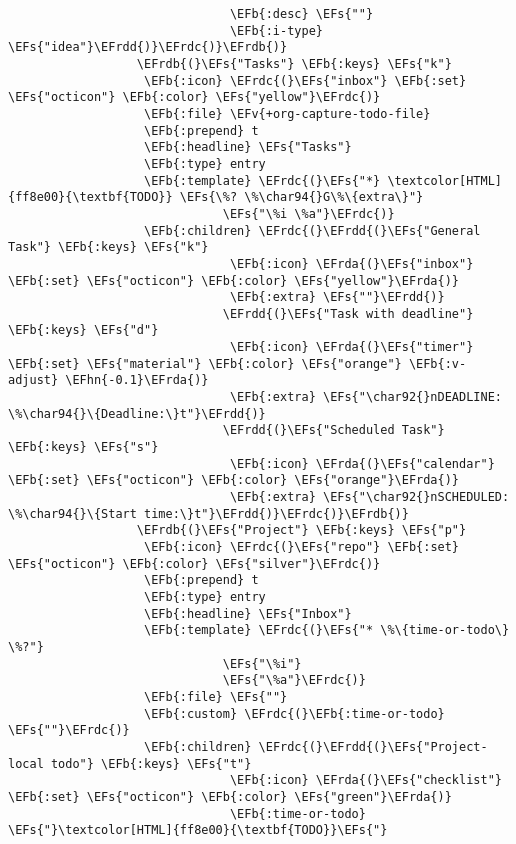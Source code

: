 \documentclass[c]{article}
\theoremstyle{plain}%
\theoremstyle{definition}
\theoremstyle{remark}
\newcommand{\EFs}[1]{\textcolor{EFs}{#1}} %
\newcommand{\EFb}[1]{\textcolor{EFb}{#1}} %
\newcommand{\EFv}[1]{\textcolor{EFv}{#1}} %
\newcommand{\EFhn}[1]{\textcolor{EFhn}{\textbf{#1}}} %
\newcommand{\EFrda}[1]{\textcolor{EFrda}{#1}} %
\newcommand{\EFrdb}[1]{\textcolor{EFrdb}{#1}} %
\newcommand{\EFrdc}[1]{\textcolor{EFrdc}{#1}} %
\newcommand{\EFrdd}[1]{\textcolor{EFrdd}{#1}} %
\begin{document}
\begin{Code}
\begin{Verbatim}
                               \EFb{:desc} \EFs{""}
                               \EFb{:i-type} \EFs{"idea"}\EFrdd{)}\EFrdc{)}\EFrdb{)}
                  \EFrdb{(}\EFs{"Tasks"} \EFb{:keys} \EFs{"k"}
                   \EFb{:icon} \EFrdc{(}\EFs{"inbox"} \EFb{:set} \EFs{"octicon"} \EFb{:color} \EFs{"yellow"}\EFrdc{)}
                   \EFb{:file} \EFv{+org-capture-todo-file}
                   \EFb{:prepend} t
                   \EFb{:headline} \EFs{"Tasks"}
                   \EFb{:type} entry
                   \EFb{:template} \EFrdc{(}\EFs{"*} \textcolor[HTML]{ff8e00}{\textbf{TODO}} \EFs{\%? \%\char94{}G\%\{extra\}"}
                              \EFs{"\%i \%a"}\EFrdc{)}
                   \EFb{:children} \EFrdc{(}\EFrdd{(}\EFs{"General Task"} \EFb{:keys} \EFs{"k"}
                               \EFb{:icon} \EFrda{(}\EFs{"inbox"} \EFb{:set} \EFs{"octicon"} \EFb{:color} \EFs{"yellow"}\EFrda{)}
                               \EFb{:extra} \EFs{""}\EFrdd{)}
                              \EFrdd{(}\EFs{"Task with deadline"} \EFb{:keys} \EFs{"d"}
                               \EFb{:icon} \EFrda{(}\EFs{"timer"} \EFb{:set} \EFs{"material"} \EFb{:color} \EFs{"orange"} \EFb{:v-adjust} \EFhn{-0.1}\EFrda{)}
                               \EFb{:extra} \EFs{"\char92{}nDEADLINE: \%\char94{}\{Deadline:\}t"}\EFrdd{)}
                              \EFrdd{(}\EFs{"Scheduled Task"} \EFb{:keys} \EFs{"s"}
                               \EFb{:icon} \EFrda{(}\EFs{"calendar"} \EFb{:set} \EFs{"octicon"} \EFb{:color} \EFs{"orange"}\EFrda{)}
                               \EFb{:extra} \EFs{"\char92{}nSCHEDULED: \%\char94{}\{Start time:\}t"}\EFrdd{)}\EFrdc{)}\EFrdb{)}
                  \EFrdb{(}\EFs{"Project"} \EFb{:keys} \EFs{"p"}
                   \EFb{:icon} \EFrdc{(}\EFs{"repo"} \EFb{:set} \EFs{"octicon"} \EFb{:color} \EFs{"silver"}\EFrdc{)}
                   \EFb{:prepend} t
                   \EFb{:type} entry
                   \EFb{:headline} \EFs{"Inbox"}
                   \EFb{:template} \EFrdc{(}\EFs{"* \%\{time-or-todo\} \%?"}
                              \EFs{"\%i"}
                              \EFs{"\%a"}\EFrdc{)}
                   \EFb{:file} \EFs{""}
                   \EFb{:custom} \EFrdc{(}\EFb{:time-or-todo} \EFs{""}\EFrdc{)}
                   \EFb{:children} \EFrdc{(}\EFrdd{(}\EFs{"Project-local todo"} \EFb{:keys} \EFs{"t"}
                               \EFb{:icon} \EFrda{(}\EFs{"checklist"} \EFb{:set} \EFs{"octicon"} \EFb{:color} \EFs{"green"}\EFrda{)}
                               \EFb{:time-or-todo} \EFs{"}\textcolor[HTML]{ff8e00}{\textbf{TODO}}\EFs{"}

\end{Verbatim}
\end{Code}
\end{document}
